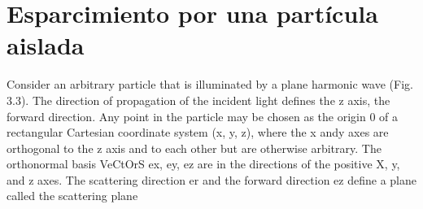 

\section{Esparcimiento por una partícula aislada}
\label{section:yth}


Consider an arbitrary particle that is illuminated by a plane harmonic wave
(Fig. 3.3). The direction of propagation of the incident light defines the z axis,
the forward direction. Any point in the particle may be chosen as the origin 0
of a rectangular Cartesian coordinate system (x, y, z), where the x andy axes
are orthogonal to the z axis and to each other but are otherwise arbitrary. The
orthonormal basis VeCtOrS ex, ey, ez are in the directions of the positive X, y,
and z axes. The scattering direction er and the forward direction ez define a
plane called the scattering plane


